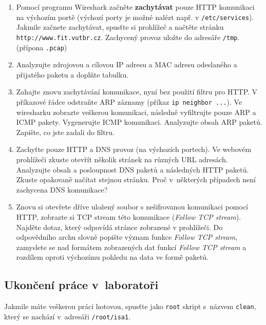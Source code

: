 \begin{enumerate}
  \item Pomocí programu Wireshark začněte \textbf{zachytávat} pouze HTTP komunikaci na výchozím portě
    (výchozí porty je možné nalézt např. v \texttt{/etc/services}). Jakmile začnete zachytávat, spusťte si prohlížeč a načtěte stránku \texttt{http://www.fit.vutbr.cz}. Zachycený provoz uložte do adresáře \texttt{/tmp}. (přípona \texttt{.pcap})
\item Analyzujte zdrojovou a cílovou IP adresu a MAC adresu odeslaného a
  přijatého paketu a doplňte tabulku.
\item Zahajte znovu zachytávání komunikace, nyní bez použití filtru pro HTTP. V příkazové řádce odstraňte ARP záznamy (příkaz \texttt{ip neighbor ...}). Ve wiresharku zobrazte veškerou komunikaci, následně vyfiltrujte pouze ARP a ICMP pakety. Vygenerujte ICMP komunikaci. Analyzujte obsah ARP paketů. Zapište, co jste zadali do filtru.
\item Zachyťte pouze HTTP a DNS provoz (na výchozích portech). Ve webovém prohlížeči zkuste otevřít několik stránek na různých URL adresách. Analyzujte obsah a posloupnost DNS paketů a následných HTTP paketů. Zkuste opakovaně načítat stejnou stránku. Proč v~některých případech není zachycena DNS komunikace?
\item Znovu si otevřete dříve uložený soubor s nešifrovanou komunikaci pomocí
  HTTP, zobrazte si TCP stream této komunikace (\emph{Follow TCP stream}).
    Najděte dotaz, který odpovídá stránce zobrazené v prohlížeči.
 Do odpovědního archu slovně popište význam funkce \emph{Follow TCP stream},
    zamyslete se nad formátem zobrazených dat funkcí \emph{Follow TCP stream} a
    rozdílem oproti výchozímu pohledu na data ve formě paketů.
\end{enumerate}

\subsection{Ukončení práce v~laboratoři}
Jakmile máte veškerou práci hotovou, spusťte jako \texttt{root} skript s~názvem \texttt{clean}, který se nachází v~adresáři \texttt{/root/isa1}.
